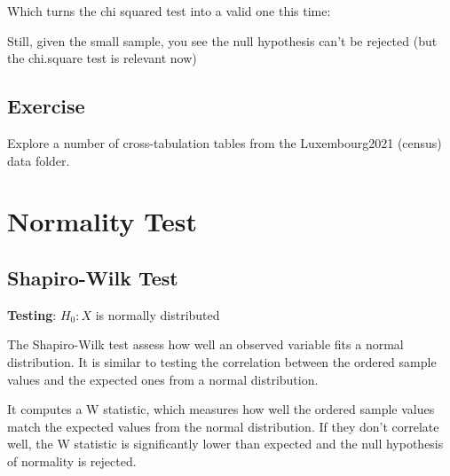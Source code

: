 \documentclass[
  letterpaper,
  DIV=11,
  numbers=noendperiod]{scrreprt}
\newenvironment{Shaded}{\begin{snugshade}}{\end{snugshade}}
\newcommand{\CommentTok}[1]{\textcolor[rgb]{0.37,0.37,0.37}{#1}}
\newcommand{\FunctionTok}[1]{\textcolor[rgb]{0.28,0.35,0.67}{#1}}
\newcommand{\NormalTok}[1]{\textcolor[rgb]{0.00,0.23,0.31}{#1}}
\newcommand{\OtherTok}[1]{\textcolor[rgb]{0.00,0.23,0.31}{#1}}
\newcommand{\SpecialCharTok}[1]{\textcolor[rgb]{0.37,0.37,0.37}{#1}}
\begin{document}
Which turns the chi squared test into a valid one this time:

\begin{Shaded}
\end{Shaded}

Still, given the small sample, you see the null hypothesis can't be
rejected (but the chi.square test is relevant now)

\section{Exercise}\label{exercise}

Explore a number of cross-tabulation tables from the Luxembourg2021
(census) data folder.

\chapter{Normality Test}\label{normality-test}

\section{Shapiro-Wilk Test}\label{shapiro-wilk-test}

\textbf{Testing}: \(H_0: X\) is normally distributed

The Shapiro-Wilk test assess how well an observed variable fits a normal
distribution. It is similar to testing the correlation between the
ordered sample values and the expected ones from a normal distribution.

It computes a W statistic, which measures how well the ordered sample
values match the expected values from the normal distribution. If they
don't correlate well, the W statistic is significantly lower than
expected and the null hypothesis of normality is rejected.
\end{document}
